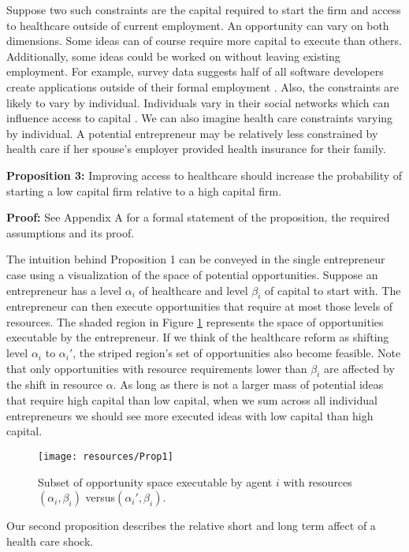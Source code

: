 \documentclass[12pt]{article}
\begin{document}
Suppose two such constraints are the capital required to start the firm and access to healthcare  outside of current employment. An opportunity can vary on both dimensions. Some ideas can of course require more capital to execute than others. Additionally, some ideas could be worked on without leaving existing employment. For example, survey data suggests half of all software developers create applications outside of their formal employment \cite{evans}. Also, the constraints are likely to vary by individual. Individuals vary in their social networks which can influence access to capital \cite{uzzi}. We can also imagine health care constraints varying by individual. A potential entrepreneur may be relatively less constrained by health care if her spouse's employer provided health insurance for their family. 

\textbf{Proposition 3:} 
Improving access to healthcare should increase the probability of starting a low capital firm relative to a high capital firm. 

\textbf{Proof:}
See Appendix A for a formal statement of the proposition, the required assumptions and its proof. 

The intuition behind Proposition 1 can be conveyed in the single entrepreneur case using a visualization of the space of potential opportunities. Suppose an entrepreneur has a level $\alpha_i$ of healthcare and level $\beta_i$ of capital to start with. The entrepreneur can then execute opportunities that require at most those levels of resources. The shaded region in Figure \ref{fig:ideaSpace} represents the space of opportunities executable by the entrepreneur. If we think of the healthcare reform as shifting level $\alpha_i$ to $\alpha_i'$, the striped region's set of opportunities also become feasible. Note that only opportunities with resource requirements lower than $\beta_i$ are affected by the shift in resource $\alpha$. As long as there is not a larger mass of potential ideas that require high capital than low capital, when we sum across all individual entrepreneurs we should see more executed ideas with low capital than high capital. 

\begin{figure}[H]
	\centering
	\texttt{[image: resources/Prop1]}
	\caption{Subset of opportunity space executable by agent $i$ with resources $(\alpha_i,\beta_i)$ versus$(\alpha_i', \beta_i)$.}
	\label{fig:ideaSpace}
\end{figure}

Our second proposition describes the relative short and long term affect of a health care shock. 
\end{document}
